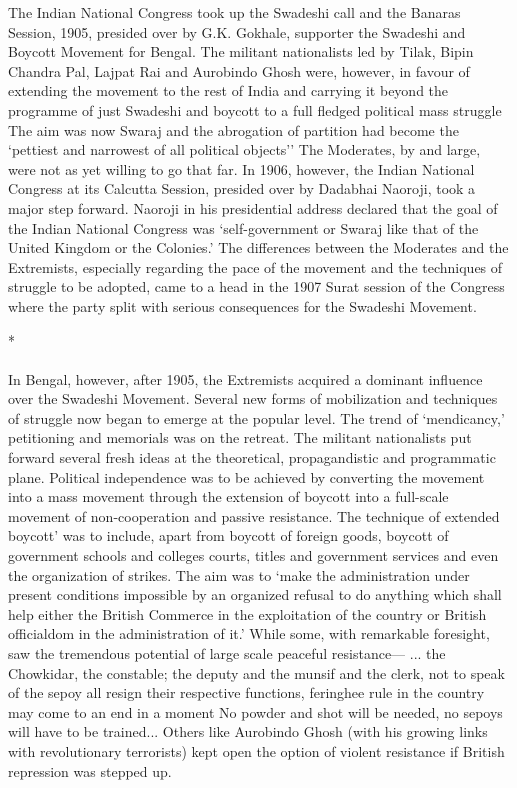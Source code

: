 The Indian National Congress took up the Swadeshi call and the Banaras Session, 1905, presided over by G.K. Gokhale, supporter the Swadeshi and Boycott Movement for Bengal. The militant nationalists led by Tilak, Bipin Chandra Pal, Lajpat Rai and Aurobindo Ghosh were, however, in favour of extending the movement to the rest of India and carrying it beyond the programme of just Swadeshi and boycott to a full fledged political mass struggle The aim was now Swaraj and the abrogation of partition had become the `pettiest and narrowest of all political objects'' The Moderates, by and large, were not as yet willing to go that far. In 1906, however, the Indian National Congress at its Calcutta Session, presided over by Dadabhai Naoroji, took a major step forward. Naoroji in his presidential address declared that the goal of the Indian National Congress was `self-government or Swaraj like that of the United Kingdom or the Colonies.' The differences between the Moderates and the Extremists, especially regarding the pace of the movement and the techniques of struggle to be adopted, came to a head in the 1907 Surat session of the Congress where the party split with serious consequences for the Swadeshi Movement.

\begin{center}*\end{center}

\paragraph*{}


In Bengal, however, after 1905, the Extremists acquired a dominant influence over the Swadeshi Movement. Several new forms of mobilization and techniques of struggle now began to emerge at the popular level. The trend of `mendicancy,' petitioning and memorials was on the retreat. The militant nationalists put forward several fresh ideas at the theoretical, propagandistic and programmatic plane. Political independence was to be achieved by converting the movement into a mass movement through the extension of boycott into a full-scale movement of non-cooperation and passive resistance. The technique of extended boycott' was to include, apart from boycott of foreign goods, boycott of government schools and colleges courts, titles and government services and even the organization of strikes. The aim was to `make the administration under present conditions impossible by an organized refusal to do anything which shall help either the British Commerce in the exploitation of the country or British officialdom in the administration of it.' While some, with remarkable foresight, saw the tremendous potential of large scale peaceful resistance--- ... the Chowkidar, the constable; the deputy and the munsif and the clerk, not to speak of the sepoy all resign their respective functions, feringhee rule in the country may come to an end in a moment No powder and shot will be needed, no sepoys will have to be trained... Others like Aurobindo Ghosh (with his growing links with revolutionary terrorists) kept open the option of violent resistance if British repression was stepped up.

